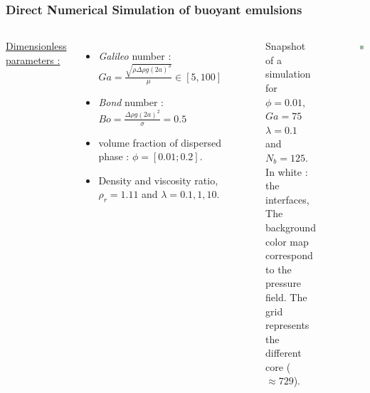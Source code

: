 \documentclass{sintefbeamer}
\begin{document}
\begin{frame}
  \frametitle{Direct Numerical Simulation of buoyant emulsions}
  \begin{columns}
  \underline{Dimensionless parameters :} 
  \begin{itemize}
    \item \textit{Galileo} number : $Ga =\frac{\sqrt{\rho \Delta\rho g(2a)^3}}{\mu} \in [5, 100]$
    \item \textit{Bond} number : $Bo = \frac{\Delta \rho g (2a)^2}{\sigma} = 0.5$ 
    \item volume fraction of dispersed phase : $\phi = [0.01;0.2]$. 
    \item Density and viscosity ratio, $\rho_r=1.11$ and $\lambda= 0.1, 1, 10$. 
  \end{itemize}
  
  \begin{figure}
    \caption{Snapshot of a simulation for $\phi = 0.01$, $Ga = 75$ $\lambda = 0.1$ and $N_b = 125$. In white : the interfaces, The background color map correspond to the pressure field. The grid represents the different core ($\approx 729$).
    }
  \end{figure}
  \centering
  \includegraphics[width =  1.1\textwidth]{image/PHI_01_Ga_75.png}
  \end{columns}
\end{frame}
\end{document}
